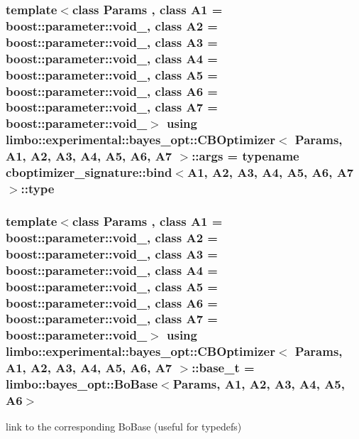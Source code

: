 \subsubsection[{args}]{\setlength{\rightskip}{0pt plus 5cm}template$<$class Params , class A1  = boost\+::parameter\+::void\+\_\+, class A2  = boost\+::parameter\+::void\+\_\+, class A3  = boost\+::parameter\+::void\+\_\+, class A4  = boost\+::parameter\+::void\+\_\+, class A5  = boost\+::parameter\+::void\+\_\+, class A6  = boost\+::parameter\+::void\+\_\+, class A7  = boost\+::parameter\+::void\+\_\+$>$ using {\bf limbo\+::experimental\+::bayes\+\_\+opt\+::\+C\+B\+Optimizer}$<$ Params, A1, A2, A3, A4, A5, A6, A7 $>$\+::{\bf args} =  typename cboptimizer\+\_\+signature\+::bind$<$A1, A2, A3, A4, A5, A6, A7$>$\+::type}\label{classlimbo_1_1experimental_1_1bayes__opt_1_1_c_b_optimizer_a0b62d16abcb5eec9dbd4b37222137c26}
\hypertarget{classlimbo_1_1experimental_1_1bayes__opt_1_1_c_b_optimizer_a6439aea347906e0e45063d74ee618a29}{}
\subsubsection[{base\+\_\+t}]{\setlength{\rightskip}{0pt plus 5cm}template$<$class Params , class A1  = boost\+::parameter\+::void\+\_\+, class A2  = boost\+::parameter\+::void\+\_\+, class A3  = boost\+::parameter\+::void\+\_\+, class A4  = boost\+::parameter\+::void\+\_\+, class A5  = boost\+::parameter\+::void\+\_\+, class A6  = boost\+::parameter\+::void\+\_\+, class A7  = boost\+::parameter\+::void\+\_\+$>$ using {\bf limbo\+::experimental\+::bayes\+\_\+opt\+::\+C\+B\+Optimizer}$<$ Params, A1, A2, A3, A4, A5, A6, A7 $>$\+::{\bf base\+\_\+t} =  {\bf limbo\+::bayes\+\_\+opt\+::\+Bo\+Base}$<$Params, A1, A2, A3, A4, A5, A6$>$}\label{classlimbo_1_1experimental_1_1bayes__opt_1_1_c_b_optimizer_a6439aea347906e0e45063d74ee618a29}


link to the corresponding Bo\+Base (useful for typedefs) 

\hypertarget{classlimbo_1_1experimental_1_1bayes__opt_1_1_c_b_optimizer_a5cb12c91d5ba4ea49768779178c6a2c6}{}
